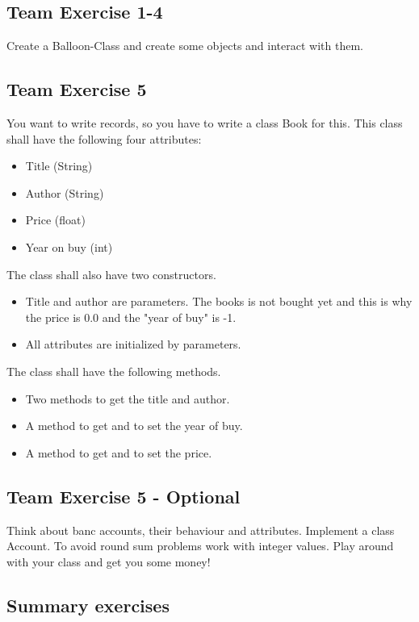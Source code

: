\newpage
\subsection{Team Exercise 1-4}
Create a Balloon-Class and create some objects and interact with them.



\newpage
\subsection{Team Exercise 5}
You want to write records, so you have to write a class Book for this.
This class shall have the following four attributes:
\begin{itemize}
	\item Title (String)
	\item Author (String)
	\item Price (float)
	\item Year on buy (int)
\end{itemize}

\noindent
The class shall also have two constructors.
\begin{itemize}
	\item Title and author are parameters. The books is not bought yet and
		this is why the price is 0.0 and the "year of buy" is -1.
	\item All attributes are initialized by parameters.
\end{itemize}

\noindent
The class shall have the following methods.
\begin{itemize}
	\item Two methods to get the title and author.
	\item A method to get and to set the year of buy.
	\item A method to get and to set the price.
\end{itemize}




\newpage
\subsection{Team Exercise 5 - Optional}
Think about banc accounts, their behaviour and attributes.
Implement a class Account. To avoid round sum problems work with
integer values. Play around with your class and get you some money!




\subsection{Summary exercises}

